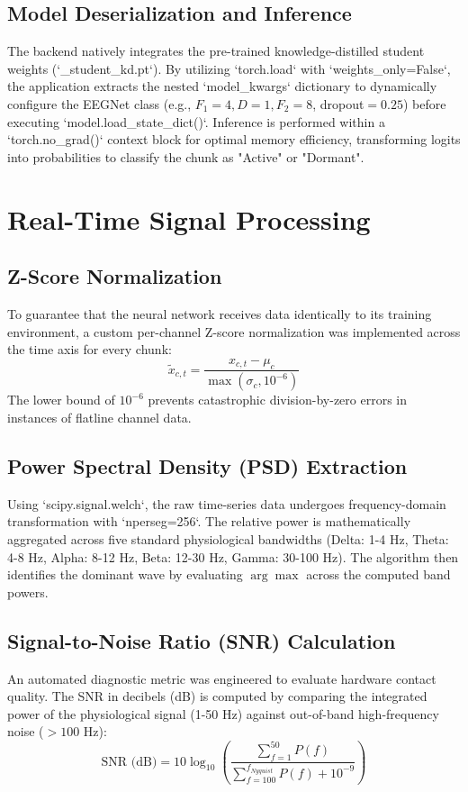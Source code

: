 \documentclass[10pt,a4paper,openright]{report}
\begin{document}
\section{Model Deserialization and Inference}
The backend natively integrates the pre-trained knowledge-distilled student weights (`_student_kd.pt`). By utilizing `torch.load` with `weights_only=False`, the application extracts the nested `model_kwargs` dictionary to dynamically configure the EEGNet class (e.g., $F_1=4, D=1, F_2=8$, dropout$=0.25$) before executing `model.load_state_dict()`. Inference is performed within a `torch.no_grad()` context block for optimal memory efficiency, transforming logits into probabilities to classify the chunk as "Active" or "Dormant".

\chapter{Real-Time Signal Processing}

\section{Z-Score Normalization}
To guarantee that the neural network receives data identically to its training environment, a custom per-channel Z-score normalization was implemented across the time axis for every chunk:
\begin{equation}
\widetilde{x}_{c,t} = \frac{x_{c,t} - \mu_c}{\max(\sigma_c, 10^{-6})}
\end{equation}
The lower bound of $10^{-6}$ prevents catastrophic division-by-zero errors in instances of flatline channel data.

\section{Power Spectral Density (PSD) Extraction}
Using `scipy.signal.welch`, the raw time-series data undergoes frequency-domain transformation with `nperseg=256`. The relative power is mathematically aggregated across five standard physiological bandwidths (Delta: 1-4 Hz, Theta: 4-8 Hz, Alpha: 8-12 Hz, Beta: 12-30 Hz, Gamma: 30-100 Hz). The algorithm then identifies the dominant wave by evaluating $\arg\max$ across the computed band powers.

\section{Signal-to-Noise Ratio (SNR) Calculation}
An automated diagnostic metric was engineered to evaluate hardware contact quality. The SNR in decibels (dB) is computed by comparing the integrated power of the physiological signal (1-50 Hz) against out-of-band high-frequency noise ($>100$ Hz):
\begin{equation}
\text{SNR (dB)} = 10 \log_{10} \left( \frac{\sum_{f=1}^{50} P(f)}{\sum_{f=100}^{f_{Nyquist}} P(f) + 10^{-9}} \right)
\end{equation}
\end{document}

